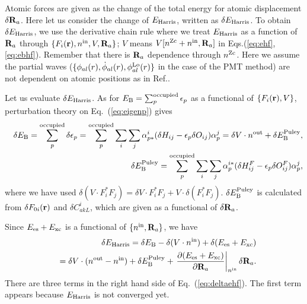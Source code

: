 \documentclass[a4paper,10pt,aip,onecolumn,amsmath,amssymb,floatfix,rmp]{revtex4-1}
\newcommand{\bfr}{{\bf r}}
\newcommand{\bfR}{{\bf R}}
\newcommand{\req}[1]{\mbox{Eq.~\!(\ref{#1})}}
\def\nzc{n^{\rm Zc}}
\def\ehf{E_{\rm Harris}}
\def\nin{n^{\rm in}}
\def\nout{n^{\rm out}}
\def\Vin{V}
\def\philo{{\phi}^{\rm Lo}_{al}}
\begin{document}
\begin{widetext}
Atomic forces are given as the change of the total energy 
for atomic displacement $\delta \bfR_a$.
Here let us consider the change of $\ehf$, written as $\delta \ehf$.
To obtain $\delta \ehf$, we use the derivative chain rule where we
treat $\ehf$ as a function of $\bfR_a$ through
$\{F_i(\bfr), \nin, \Vin, \bfR_a\}$; $\Vin$ means $V[\nzc+\nin,\bfR_a]$ in 
Eqs.(\ref{eq:ehf},\ref{eq:ebhf}).
Remember that there is $\bfR_a$ dependence through $\nzc$.
Here we assume the partial waves
($\{\phi_{al}(r),\dot{\phi}_{al}(r),\philo(r) \}$ in the case of the PMT
method) are not dependent on atomic positions as in Ref.\cite{molforce}.

Let us evaluate $\delta \ehf$. 
As for $E_{\rm B}=\sum_p^{\rm occupied} \epsilon_p$ 
as a functional of $\{F_i(\bfr),\Vin\}$, perturbation theory on
\req{eq:eigenp} gives
\begin{eqnarray}
&&\delta E_{\rm B} = \sum_p^{\rm occupied} \delta \epsilon_p
=\sum_p^{\rm occupied} \sum_i \sum_j 
\alpha_{p*}^i (\delta H_{ij} -\epsilon_p \delta O_{ij}) \alpha_p^j
=\delta \Vin\cdot \nout + \delta E_{\rm B}^{\rm Puley}, \label{eq:deleb}\\
&&\delta E_{\rm B}^{\rm Puley}=\sum_p^{\rm occupied} \sum_i \sum_j 
\alpha_{p}^{i*} (\delta H^F_{ij} -\epsilon_p \delta O^F_{ij}) \alpha_p^j,
\end{eqnarray}
where we have used $\delta (\Vin\cdot F^*_i F_j)=\delta \Vin 
\cdot F^*_i F_j + \Vin\cdot \delta (F^*_i F_j)$.
$\delta E_{\rm B}^{\rm Puley}$ is calculated from 
$\delta F_{0i}(\bfr)$ and $\delta C^i_{akL}$, which 
are given as a functional of $\delta \bfR_a$.

Since $E_{\rm es} + E_{\rm xc}$ is a functional of $\{\nin,\bfR_a\}$, we have
\begin{eqnarray}
&&\delta \ehf = \delta E_{\rm B} - \delta (\Vin \cdot \nin) 
  + \delta (E_{\rm es} + E_{\rm xc}) \nonumber \\
&&= \delta \Vin \cdot (\nout- \nin) 
  + \delta E_{\rm B}^{\rm Puley} 
  + \left.\frac{\partial (E_{\rm es} + E_{\rm xc})}{\partial \bfR_a}\right|_{\nin} \delta \bfR_a.
\label{eq:deltaehf} 
\end{eqnarray}
There are three terms in the right hand side of \req{eq:deltaehf}.
The first term appears because $\ehf$ is not converged yet.


\end{widetext}
\end{document}
